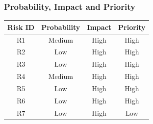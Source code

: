 \documentclass{article}
\begin{document}
\subsubsection{Probability, Impact and Priority}
\begin{center}
 \begin{tabular}{|c c c c|} 
 \hline
 Risk ID & Probability & Impact & Priority \\ [0.5ex] 
 \hline\hline
 R1 & Medium & High & High \\ 
 \hline
 R2 & Low & High & High \\
 \hline
 R3 & Low & High & High \\
 \hline
 R4 & Medium & High & High \\
 \hline
 R5 & Low & High & High \\
 \hline
 R6 & Low & High & High \\
 \hline
 R7 & Low & High & Low \\ 
 \hline
\end{tabular}
\end{center}
\end{document}
